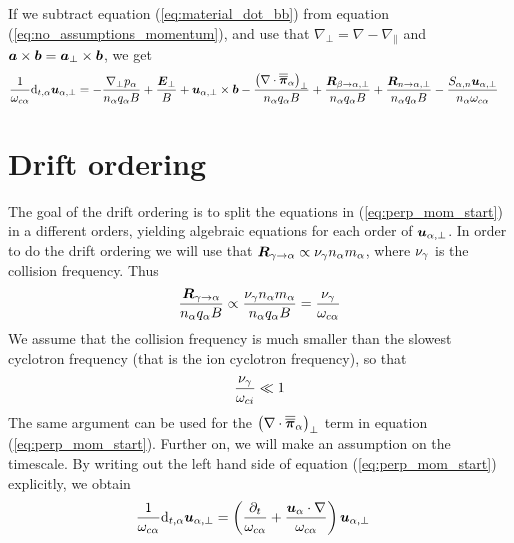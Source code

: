 %
If we subtract equation (\ref{eq:material_dot_bb}) from equation (\ref{eq:no_assumptions_momentum}), and use that  $\nabla_\perp = \nabla - \nabla_\|$ and $\boldsymbol{a}\times\boldsymbol{b}=\boldsymbol{a}_\perp\times\boldsymbol{b}$, we get
%
\begin{align}
 \frac{1}{\omega_{c\alpha}}\text{d}_{t,\alpha} \boldsymbol{u}_{\alpha,\perp}
 &=
 -
 \frac{
   \nabla_\perp p_\alpha
 }{n_\alpha  q_\alpha B}
 +
 \frac{\boldsymbol{E}_\perp}{B}
 +
 \boldsymbol{u}_{\alpha,\perp}\times\boldsymbol{b}
 -
  \frac{
   \left(\nabla\cdot\boldsymbol{\overline{\overline{\pi}}}_\alpha\right)_\perp
 }{n_\alpha  q_\alpha B}
 +
 \frac{
   \boldsymbol{R}_{\beta \to \alpha,\perp}
 }{n_\alpha q_\alpha B}
 +
 \frac{
   \boldsymbol{R}_{n \to \alpha,\perp}
 }{n_\alpha q_\alpha B}
 -
 \frac{
     S_{\alpha,n}\boldsymbol{u}_{\alpha,\perp}
 }{n_\alpha \omega_{c\alpha}}
 \label{eq:perp_mom_start}
\end{align}

\section{Drift ordering}\label{sec:drift_order}
The goal of the drift ordering is to split the equations in (\ref{eq:perp_mom_start}) in a different orders, yielding algebraic equations for each order of $\boldsymbol{u}_{\alpha,\perp}$.
In order to do the drift ordering we will use that $\boldsymbol{R}_{\gamma \to \alpha} \propto \nu_\gamma n_\alpha m_\alpha$, where $\nu_\gamma$ is the collision frequency.
Thus
%
\begin{align*}
 \frac{\boldsymbol{R}_{\gamma \to \alpha}}{n_\alpha q_\alpha B}
 \propto \frac{\nu_\gamma n_\alpha m_\alpha}{n_\alpha q_\alpha B}
 = \frac{\nu_\gamma}{\omega_{c\alpha}}
\end{align*}
%
We assume that the collision frequency is much smaller than the slowest cyclotron frequency (that is the ion cyclotron frequency), so that
%
\begin{align*}
 \frac{\nu_\gamma}{\omega_{ci}} \ll 1
\end{align*}
%
The same argument can be used for the $\left(\nabla\cdot \boldsymbol{\overline{\overline{\pi}}}_\alpha\right)_\perp$ term in equation (\ref{eq:perp_mom_start}).
Further on, we will make an assumption on the timescale.
By writing out the left hand side of equation (\ref{eq:perp_mom_start}) explicitly, we obtain
%
\begin{align*}
 \frac{1}{\omega_{c\alpha}}\text{d}_{t,\alpha} \boldsymbol{u}_{\alpha,\perp} &=
 \left(\frac{\partial_t}{\omega_{c\alpha}} +
 \frac{\boldsymbol{u}_{\alpha}\cdot\nabla}{\omega_{c\alpha}}\right) \boldsymbol{u}_{\alpha,\perp}
\end{align*}
